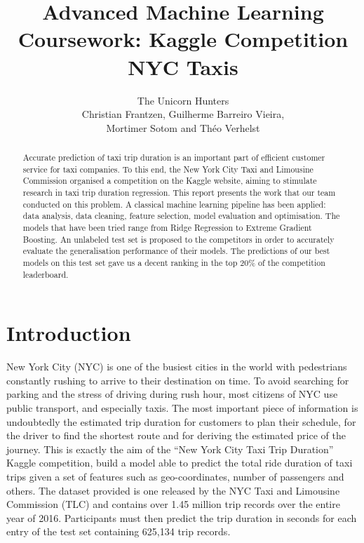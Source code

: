 \documentclass[a4paper]{article}
\author{The Unicorn Hunters\\
Christian Frantzen, Guilherme Barreiro Vieira,\\
Mortimer Sotom and Théo Verhelst}
\title{Advanced Machine Learning Coursework: Kaggle Competition NYC Taxis}
\begin{document}
\maketitle


\begin{abstract}
Accurate prediction of taxi trip duration is an important part of efficient
customer service for taxi companies. To this end, the New York City Taxi
and Limousine Commission organised a competition on the Kaggle website, aiming
to stimulate research in taxi trip duration regression. This report presents the
work that our team conducted on this problem. A classical machine learning
pipeline has been applied: data analysis, data cleaning, feature selection,
model evaluation and optimisation. The models that have been tried range from
Ridge Regression to Extreme Gradient Boosting. An unlabeled test set is proposed
to the competitors in order to accurately evaluate the generalisation
performance of their models. The predictions of our best models on this test set
gave us a decent ranking in the top 20\% of the competition leaderboard.
\end{abstract}

\section{Introduction}
New York City (NYC) is one of the busiest cities in the world with pedestrians
constantly rushing to arrive to their destination on time. To avoid searching
for parking and the stress of driving during rush hour, most citizens of NYC use
public transport, and especially taxis. The most important piece of information
is undoubtedly the estimated trip duration for customers to plan their schedule,
for the driver to find the shortest route and for deriving the estimated price
of the journey. This is exactly the aim of the ``New York City Taxi Trip
Duration'' Kaggle competition, build a model able to predict the total ride
duration of taxi trips given a set of features such as geo-coordinates, number
of passengers and others. The dataset provided is one released by the NYC Taxi
and Limousine Commission (TLC) and contains over 1.45 million trip records over
the entire year of 2016. Participants must then predict the trip duration in
seconds for each entry of the test set containing 625,134 trip records.
\end{document}

